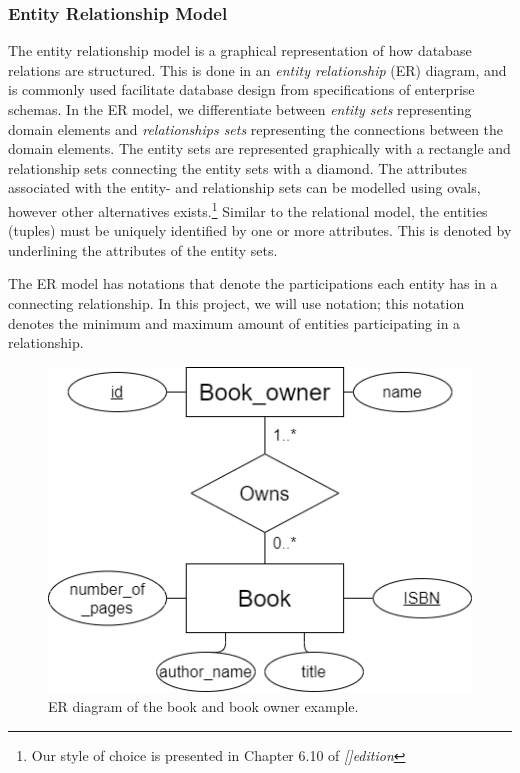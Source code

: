 \subsubsection{Entity Relationship Model}\label{sec:EntityRelationModel}
The entity relationship model is a graphical representation of how database relations are structured.
This is done in an \textit{entity relationship} (ER) diagram, and is commonly used facilitate database design from specifications of enterprise schemas\cite{DBSBook}.
In the ER model, we differentiate between \textit{entity sets} representing domain elements and \textit{relationships sets} representing the connections between the domain elements. 
The entity sets are represented graphically with a rectangle and relationship sets connecting the entity sets with a diamond\cite{DBSBook}.
The attributes associated with the entity- and relationship sets can be modelled using ovals\cite{KatjaFirstPP}, however other alternatives exists.\footnote{Our style of choice is presented in Chapter 6.10 of  \textit{[]{edition}}}
Similar to the relational model, the entities (tuples) must be uniquely identified by one or more attributes. This is denoted by underlining the attributes of the entity sets. 

The ER model has notations that denote the participations each entity has in a connecting relationship\cite{DBSBook}.
In this project, we will use  notation; this notation denotes the minimum and maximum amount of entities participating in a relationship. 

\begin{figure}[htp]
    \centering
    \includegraphics[scale=0.5]{Images/book_example_w_cardinality.png}
    \caption{ER diagram of the book and book owner example.}
    \label{fig:ER_Book_Example}
\end{figure}

